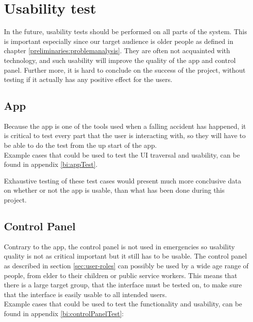 \section{Usability test}
\label{sec:usability-test}

In the future, usability tests should be performed on all parts of the system. This is important especially since our target audience is older people as defined in chapter \ref{preliminaries:problemanalysis}. They are often not acquainted with technology, and such usability will improve the quality of the app and control panel. Further more, it is hard to conclude on the success of the project, without testing if it actually has any positive effect for the users.

\subsection{App}
Because the app is one of the tools used when a falling accident has happened, it is critical to test every part that the user is interacting with, so they will have to be able to do the test from the up start of the app.\\
Example cases that could be used to test the UI traversal and usability, can be found in appendix \ref{bi:appTest}.

Exhaustive testing of these test cases would present much more conclusive data on whether or not the app is usable, than what has been done during this project.

\subsection{Control Panel}
Contrary to the app, the control panel is not used in emergencies so usability quality is not as critical important but it still has to be usable. The control panel as described in section \ref{sec:user-roles} can possibly be used by a wide age range of people, from elder to their children or public service workers. This means that there is a large target group, that the interface must be tested on, to make sure that the interface is easily usable to all intended users.\\
Example cases that could be used to test the functionality and usability, can be found in appendix \ref{bi:controlPanelTest}:
